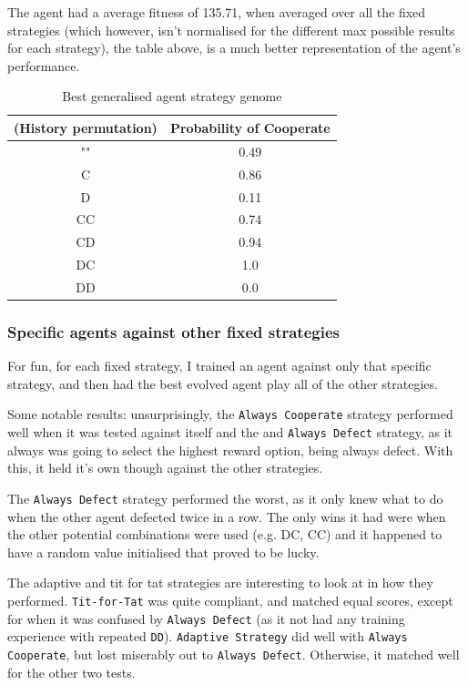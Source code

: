 \documentclass[11pt]{scrartcl} %
\begin{document}
The agent had a average fitness of 135.71, when averaged over all the fixed strategies 
(which however, isn't normalised for the different max possible results for each strategy), the table above, is a much better representation of the agent's performance.

\begin{table}[h!]
	\centering
	\begin{tabular}{|c|c|}
		\hline
		\textbf{(History permutation)} & \textbf{Probability of Cooperate} \\ \hline
		"" & 0.49 \\ \hline
		C & 0.86 \\ \hline
		D & 0.11 \\ \hline
		CC & 0.74 \\ \hline
		CD & 0.94 \\ \hline
		DC & 1.0 \\ \hline
		DD & 0.0 \\ \hline
	\end{tabular}
	\caption{Best generalised agent strategy genome}
	\label{tab:history_probabilities}
\end{table}

\subsubsection{Specific agents against other fixed strategies}

For fun, for each fixed strategy, I trained an agent against only that specific strategy, and then had the best evolved agent play all of the other strategies.

Some notable results: unsurprisingly, the \texttt{Always Cooperate} strategy performed well when it was tested against itself and the and \texttt{Always Defect} strategy, as it always was going to select the highest reward option, being always defect.
With this, it held it's own though against the other strategies.

The \texttt{Always Defect} strategy performed the worst, as it only knew what to do when the other agent defected twice in a row. 
The only wins it had were when the other potential combinations were used (e.g. DC, CC) and it happened to have a random value initialised that proved to be lucky.


The adaptive and tit for tat strategies are interesting to look at in how they performed.
\texttt{Tit-for-Tat} was quite compliant, and matched equal scores, except for when it was confused by \texttt{Always Defect} (as it not had any training experience with repeated \texttt{DD}).
\texttt{Adaptive Strategy} did well with \texttt{Always Cooperate}, but lost miserably out to \texttt{Always Defect}. Otherwise, it matched well for the other two tests.
\end{document}

